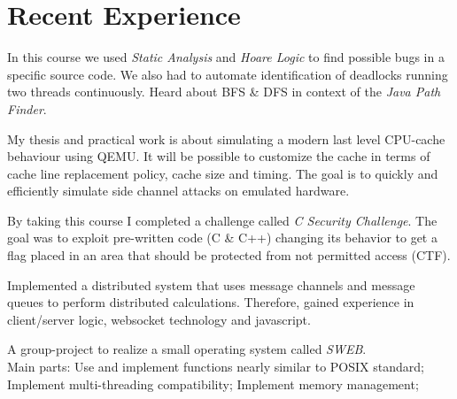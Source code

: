 \documentclass[]{resume}
\begin{document}
\begin{minipage}[t]{0.66\textwidth} 
	\section{Recent Experience} 
		In this course we used \textit{Static Analysis} and \textit{Hoare Logic} to find possible bugs in a specific source code. We also had to automate identification of deadlocks running two threads continuously. Heard about BFS \& DFS in context of the \textit{Java Path Finder}.  \sectionsep
	
		My thesis and practical work is about simulating a modern last level CPU-cache behaviour using QEMU. It will be possible to customize the cache in terms of cache line replacement policy, cache size and timing. The goal is to quickly and efficiently simulate side channel attacks on emulated hardware. \sectionsep
	
		By taking this course I completed a challenge called \textit{C Security Challenge}. The goal was to exploit pre-written code (C \& C++) changing its behavior to get a flag placed in an area that should be protected from not permitted access (CTF). \sectionsep
		
		Implemented a distributed system that uses message channels and message queues to perform distributed calculations. Therefore, gained experience in client/server logic, websocket technology and javascript. \sectionsep
		
		A group-project to realize a small operating system called \textit{SWEB}. \\ 
		Main parts: Use and implement functions nearly similar to POSIX standard; Implement multi-threading compatibility; Implement memory management;\sectionsep 
		
\end{minipage} 
\vfill \vfill \vfill \vfill
\end{document}
